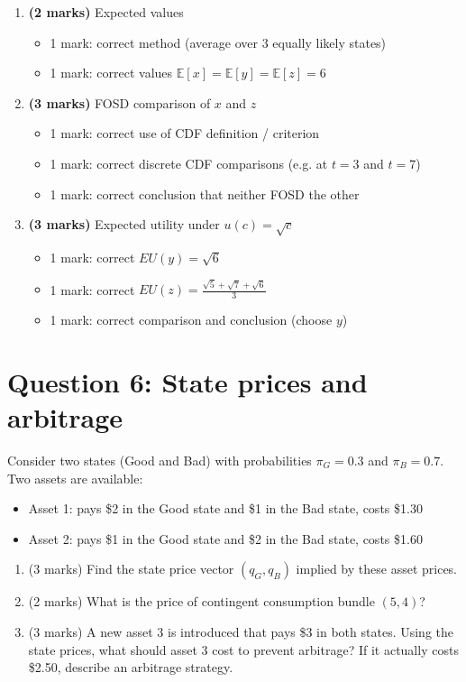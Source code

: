 \documentclass[12pt]{article}
\begin{document}
\begin{enumerate}[label=(\alph*)]
\item \textbf{(2 marks)} Expected values
\begin{itemize}
\item 1 mark: correct method (average over 3 equally likely states)
\item 1 mark: correct values \(\mathbb E[x]=\mathbb E[y]=\mathbb E[z]=6\)
\end{itemize}

\item \textbf{(3 marks)} FOSD comparison of \(x\) and \(z\)
\begin{itemize}
\item 1 mark: correct use of CDF definition / criterion
\item 1 mark: correct discrete CDF comparisons (e.g. at \(t=3\) and \(t=7\))
\item 1 mark: correct conclusion that neither FOSD the other
\end{itemize}

\item \textbf{(3 marks)} Expected utility under \(u(c)=\sqrt c\)
\begin{itemize}
\item 1 mark: correct \(EU(y)=\sqrt6\)
\item 1 mark: correct \(EU(z)=\frac{\sqrt5+\sqrt7+\sqrt6}{3}\)
\item 1 mark: correct comparison and conclusion (choose \(y\))
\end{itemize}
\end{enumerate}


\newpage
\section*{Question 6: State prices and arbitrage}

Consider two states (Good and Bad) with probabilities $\pi_G = 0.3$ and $\pi_B = 0.7$. Two assets are available:
\begin{itemize}
\item Asset 1: pays \$2 in the Good state and \$1 in the Bad state, costs \$1.30
\item Asset 2: pays \$1 in the Good state and \$2 in the Bad state, costs \$1.60
\end{itemize}

\begin{enumerate}[label=(\alph*)]
\item (3 marks) Find the state price vector $(q_G, q_B)$ implied by these asset prices.
\item (2 marks) What is the price of contingent consumption bundle $(5, 4)$?
\item (3 marks) A new asset 3 is introduced that pays \$3 in both states. Using the state prices, what should asset 3 cost to prevent arbitrage? If it actually costs \$2.50, describe an arbitrage strategy.
\end{enumerate}
\end{document}

